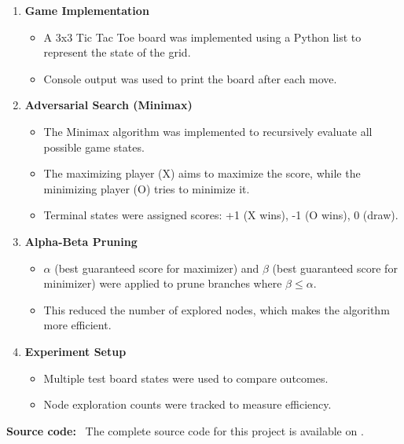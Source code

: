\documentclass[14pt]{extreport}
\begin{document}
\begin{enumerate}[itemsep=1em]
    \item \textbf{Game Implementation}
    \begin{itemize}[itemsep=0.5em, topsep=1em]
        \item A 3x3 Tic Tac Toe board was implemented using a Python list to represent the state of the grid.
        \item Console output was used to print the board after each move.
    \end{itemize}
    \item \textbf{Adversarial Search (Minimax)}
    \begin{itemize}[itemsep=0.5em, topsep=1em]
        \item The Minimax algorithm was implemented to recursively evaluate all possible game states.
        \item The maximizing player (X) aims to maximize the score, while the minimizing player (O) tries to minimize it.
        \item Terminal states were assigned scores: +1 (X wins), -1 (O wins), 0 (draw).
    \end{itemize}
    \item \textbf{Alpha-Beta Pruning}
    \begin{itemize}[itemsep=0.5em, topsep=1em]
        \item $\alpha$ (best guaranteed score for maximizer) and $\beta$ (best guaranteed score for minimizer) were applied to prune branches where $\beta \leq \alpha$.
        \item This reduced the number of explored nodes, which makes the algorithm more efficient.
    \end{itemize}

    \item \textbf{Experiment Setup}
    \begin{itemize}[itemsep=0.5em, topsep=1em]
        \item Multiple test board states were used to compare outcomes.
        \item Node exploration counts were tracked to measure efficiency.
    \end{itemize}
\end{enumerate}


\vspace{1em}

\textbf{Source code:} \ 
The complete source code for this project is available on \href{https://github.com/Arefin40/AI-Lab}{}.
\end{document}
